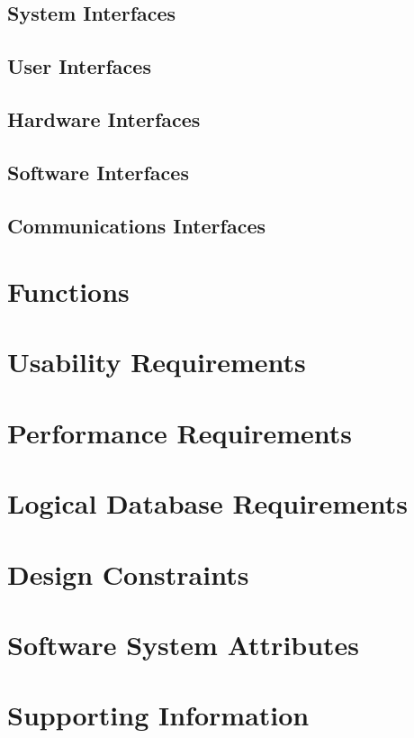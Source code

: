 \documentclass[ 10pt]{report}
\begin{document}
            \subsection{System Interfaces}
            \subsection{User Interfaces}
            \subsection{Hardware Interfaces}
            \subsection{Software Interfaces}
            \subsection{Communications Interfaces}
        \section{Functions}
        \section{Usability Requirements}
        \section{Performance Requirements}
        \section{Logical Database Requirements}
        \section{Design Constraints}
        \section{Software System Attributes}
        \section{Supporting Information}
    \pagebreak
\end{document}

